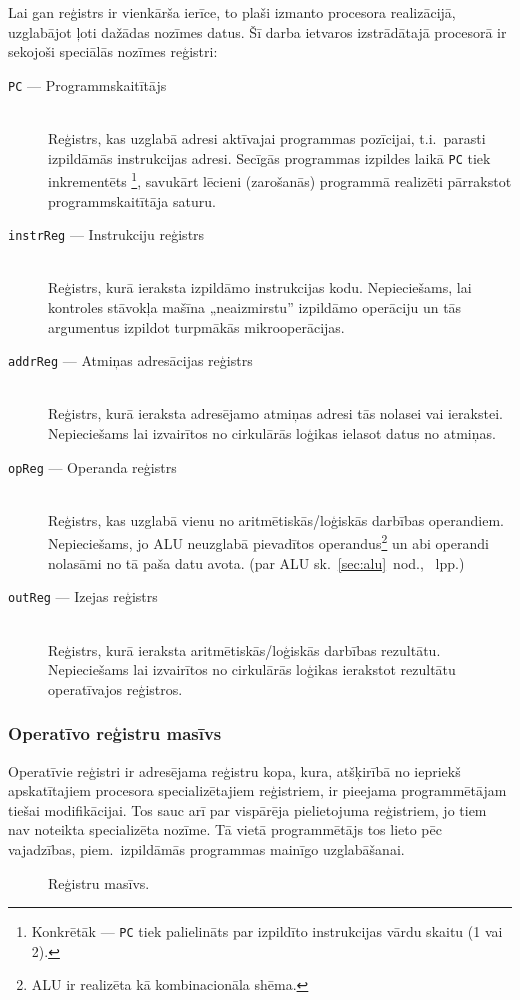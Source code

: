 	\pagebreak[3]
	Lai gan reģistrs ir vienkārša ierīce, to plaši izmanto procesora
	realizācijā, uzglabājot ļoti dažādas nozīmes datus.
	Šī darba ietvaros izstrādātajā procesorā ir sekojoši speciālās nozīmes reģistri:
	\begin{description}
		\item[\texttt{PC} — Programmskaitītājs] \hfill \\
			Reģistrs, kas uzglabā adresi aktīvajai programmas pozīcijai,
			t.i.~parasti izpildāmās instrukcijas adresi. Secīgās programmas
			izpildes laikā \texttt{PC} tiek inkrementēts%
			\footnote{Konkrētāk — \texttt{PC} tiek palielināts par
				izpildīto instrukcijas vārdu skaitu (1 vai 2).},
			savukārt lēcieni (zarošanās)
			programmā realizēti pārrakstot programmskaitītāja saturu.
		\item[\texttt{instrReg} — Instrukciju reģistrs] \hfill \\
			Reģistrs, kurā ieraksta izpildāmo instrukcijas kodu.
			Nepieciešams, lai kontroles stāvokļa mašīna „neaizmirstu”
			izpildāmo operāciju un tās argumentus izpildot
			turpmākās mikro\-operācijas.
		\item[\texttt{addrReg} — Atmiņas adresācijas reģistrs] \hfill \\
			Reģistrs, kurā ieraksta adresējamo atmiņas adresi tās nolasei
			vai ierakstei. Nepieciešams lai izvairītos no
			cirkulārās loģikas ielasot datus no atmiņas.
			\todo %
		\item[\texttt{opReg} — Operanda reģistrs] \hfill \\
			Reģistrs, kas uzglabā vienu no aritmētiskās/loģiskās darbības
			ope\-ran\-diem. Nepieciešams, jo ALU neuzglabā pievadītos
			operandus\footnote{ALU ir realizēta kā kombinacionāla shēma.}
			un abi operandi nolasāmi no tā paša datu avota.
			(par ALU sk.~\ref{sec:alu}~nod., \pageref{sec:alu}~lpp.)
		\item[\texttt{outReg} — Izejas reģistrs] \hfill \\
			Reģistrs, kurā ieraksta aritmētiskās/loģiskās darbības rezultātu.
			Nepieciešams lai izvairītos no cirkulārās loģikas
			ierakstot rezultātu operatīvajos reģistros.
	\end{description}

\pagebreak[3]
\FloatBarrier
\subsubsection{Operatīvo reģistru masīvs}
	Operatīvie reģistri ir adresējama reģistru kopa, kura, atšķirībā no
	iepriekš apskatītajiem procesora specializētajiem reģistriem,
	ir pieejama	programmētājam tiešai modifikācijai.
	Tos sauc arī par vispārēja pielietojuma reģistriem, 
	jo tiem nav noteikta specializēta nozīme.
	Tā vietā programmētājs tos lieto pēc vajadzības, piem.~izpildāmās
	programmas mainīgo uzglabāšanai.
	\begin{figure}[th]
		\centering
		\def\svgscale{1.25}
		{\ttfamily\scriptsize}
		\caption{Reģistru masīvs.}
		\label{fig:regArray}
	\end{figure}
	
